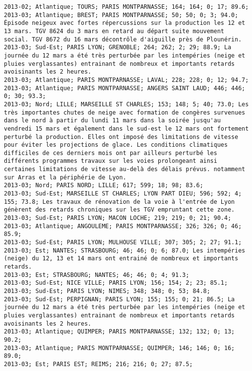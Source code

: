 \documentclass{article}
\begin{document}
\begin{Verbatim}[commandchars=\\\{\}]
2013-02; Atlantique; TOURS; PARIS MONTPARNASSE; 164; 164; 0; 17; 89.6; 
2013-03; Atlantique; BREST; PARIS MONTPARNASSE; 50; 50; 0; 3; 94.0; Épisode neigeux avec fortes répercussions sur la production les 12 et 13 mars. TGV 8624 du 3 mars en retard au départ suite mouvement social. TGV 8672 du 16 mars décontrôle d'aiguille près de Plounérin.
2013-03; Sud-Est; PARIS LYON; GRENOBLE; 264; 262; 2; 29; 88.9; La journée du 12 mars a été très perturbée par les intempéries (neige et pluies verglassantes) entrainant de nombreux et importants retards avoisinants les 2 heures.
2013-03; Atlantique; PARIS MONTPARNASSE; LAVAL; 228; 228; 0; 12; 94.7; 
2013-03; Atlantique; PARIS MONTPARNASSE; ANGERS SAINT LAUD; 446; 446; 0; 30; 93.3; 
2013-03; Nord; LILLE; MARSEILLE ST CHARLES; 153; 148; 5; 40; 73.0; Les très importantes chutes de neige avec formation de congères survenues dans le nord à partir du lundi 11 mars dans la soirée jusqu'au vendredi 15 mars et également dans le sud-est le 12 mars ont fortement perturbé la production. Elles ont imposé des limitations de vitesse pour éviter les projections de glace. Les conditions climatiques difficiles de ces derniers mois ont par ailleurs perturbé les différents programmes travaux sur les voies prolongeant ainsi certaines limitations de vitesse au-delà des délais prévus. notamment sur Arras et la périphérie de Lyon.
2013-03; Nord; PARIS NORD; LILLE; 617; 599; 18; 98; 83.6; 
2013-03; Sud-Est; MARSEILLE ST CHARLES; LYON PART DIEU; 596; 592; 4; 155; 73.8; Les travaux de rénovation de la voie à l'entrée de Lyon génèrent des retards chroniques sur les TGV empruntant cette zone.
2013-03; Sud-Est; PARIS LYON; MACON LOCHE; 219; 219; 0; 21; 90.4; 
2013-03; Atlantique; ANGOULEME; PARIS MONTPARNASSE; 326; 326; 0; 46; 85.9; 
2013-03; Sud-Est; PARIS LYON; MULHOUSE VILLE; 307; 305; 2; 27; 91.1; 
2013-03; Est; NANTES; STRASBOURG; 46; 46; 0; 6; 87.0; Les intempéries (neige) du 12, 13 et 14 mars ont entrainé de nombreux et importants retards.
2013-03; Est; STRASBOURG; NANTES; 46; 46; 0; 4; 91.3; 
2013-03; Sud-Est; NICE VILLE; PARIS LYON; 156; 154; 2; 23; 85.1; 
2013-03; Sud-Est; PARIS LYON; NIMES; 348; 348; 0; 53; 84.8; 
2013-03; Sud-Est; PERPIGNAN; PARIS LYON; 155; 155; 0; 21; 86.5; La journée du 12 mars a été très perturbée par les intempéries (neige et pluies verglassantes) entrainant de nombreux et importants retards avoisinants les 2 heures.
2013-03; Atlantique; QUIMPER; PARIS MONTPARNASSE; 132; 132; 0; 13; 90.2; 
2013-03; Atlantique; PARIS MONTPARNASSE; QUIMPER; 146; 146; 0; 16; 89.0; 
2013-03; Est; PARIS EST; REIMS; 216; 216; 0; 27; 87.5; 

\end{Verbatim}
\end{document}

